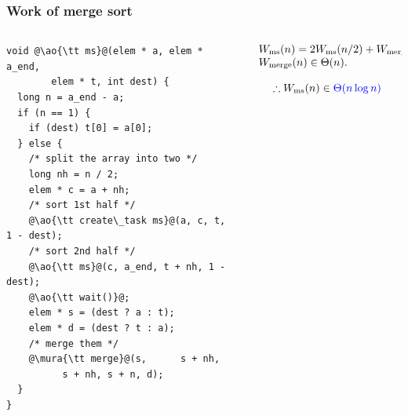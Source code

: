 \documentclass[12pt,dvipdfmx]{beamer}
\newcommand{\mura}[1]{{\color{purple}#1}}
\newcommand{\ao}[1]{{\color{blue}#1}}
\begin{document}
\begin{frame}[fragile]
\frametitle{Work of merge sort}
\begin{columns}
\begin{column}{0.48\textwidth}
\begin{lstlisting}
void @\ao{\tt ms}@(elem * a, elem * a_end, 
        elem * t, int dest) {
  long n = a_end - a;
  if (n == 1) {
    if (dest) t[0] = a[0];
  } else {
    /* split the array into two */
    long nh = n / 2;
    elem * c = a + nh;
    /* sort 1st half */
    @\ao{\tt create\_task ms}@(a, c, t, 1 - dest);
    /* sort 2nd half */
    @\ao{\tt ms}@(c, a_end, t + nh, 1 - dest);
    @\ao{\tt wait()}@;
    elem * s = (dest ? a : t);
    elem * d = (dest ? t : a);
    /* merge them */
    @\mura{\tt merge}@(s,      s + nh, 
          s + nh, s + n, d);
  }
}
\end{lstlisting}
\end{column}

\begin{column}{0.52\textwidth}
\[
\begin{array}{l}
W_{\mbox{\scriptsize ms}}(n)
= 2W_{\mbox{\scriptsize ms}}(n/2)
+ W_{\mbox{\scriptsize merge}}(n), \\
W_{\mbox{\scriptsize merge}}(n) \in \Theta(n).
\end{array}
\]

\[ \therefore W_{\mbox{\scriptsize ms}}(n) \in \ao{\Theta(n \log n)} \]
\end{column}
\end{columns}
\end{frame}
\end{document}
